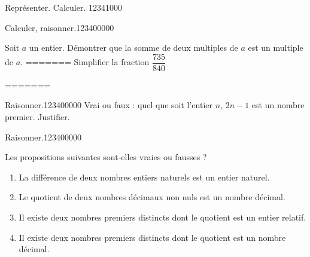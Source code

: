 \begin{pageAD}
\begin{ExoCad}{Représenter. Calculer. }{1234}{1}{0}{0}{0}
\begin{minipage}{0.4\linewidth}
\end{minipage}

\end{ExoCad} 

\begin{ExoCad}{Calculer, raisonner.}{1234}{0}{0}{0}{0}{0}


Soit $a$ un entier. Démontrer que la somme de deux multiples de $a$ est un multiple de $a$. 
=======
Simplifier la fraction $\dfrac{735}{840}$ 



\end{ExoCad}



=======


\begin{ExoCad}{Raisonner.}{1234}{0}{0}{0}{0}{0}
Vrai ou faux : quel que soit l'entier $n$, $2n-1$ est un nombre premier. Justifier.
\end{ExoCad}


 
\begin{ExoCad}{Raisonner.}{1234}{0}{0}{0}{0}{0}

Les propositions suivantes sont-elles vraies ou fausses ?
\begin{enumerate}[leftmargin=*]
\item La différence de deux nombres entiers naturels est un entier naturel. 
\item Le quotient de deux nombres décimaux non nuls est un nombre décimal.  
\item Il existe deux nombres premiers distincts dont le quotient est un
  entier relatif. 
\item Il existe deux nombres premiers distincts dont le quotient est un
  nombre décimal. 
\end{enumerate} 
 
 \end{ExoCad}
 
\end{pageAD}


